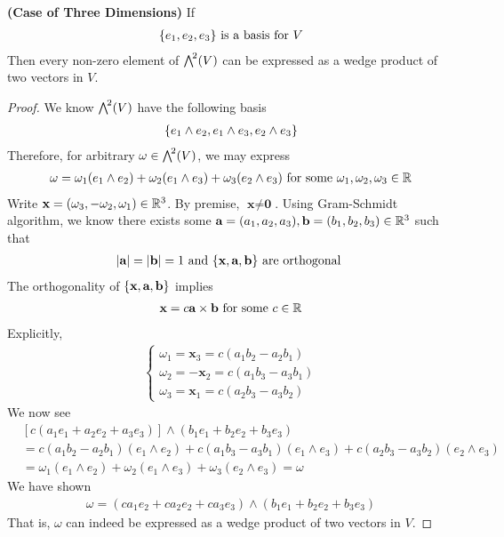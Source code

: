 \documentclass{report}
\begin{document}
\begin{theorem}
\textbf{(Case of Three Dimensions)} If 
\begin{align*}
  \{ e_1,e_2,e_3 \}\text{ is a basis for }V
\end{align*}
Then every non-zero element of $\extp^2(V)$ can be expressed as a wedge product of two vectors in $V$. 
\end{theorem}
\begin{proof}
We know $\extp^2(V)$ have the following basis  
\begin{align*}
\{ e_1\wedge  e_2, e_1 \wedge  e_3, e_2 \wedge  e_3 \} 
\end{align*}
Therefore, for arbitrary $\omega  \in \extp^2(V)$, we may express 
\begin{align*}
\omega = \omega_1 (e_1 \wedge e_2)+ \omega_2 (e_1 \wedge  e_3) + \omega_3 (e_2 \wedge  e_3)  \text{ for some }\omega_1,\omega_2,\omega_3 \in\mathbb{R}
\end{align*}
Write $\textbf{x}=(\omega_3,-\omega_2,\omega_1)\in\mathbb{R}^3$. By premise, $\textbf{x}\neq \textbf{0}$. Using Gram-Schmidt algorithm, we know there exists some $\textbf{a}=(a_1,a_2,a_3),\textbf{b}=(b_1,b_2,b_3)\in\mathbb{R}^3$ such that 
\begin{align*}
\left|\textbf{a}\right|=\left|\textbf{b}\right|=1 \text{ and }\{ \textbf{x},\textbf{a},\textbf{b} \}\text{ are orthogonal }
\end{align*}
The orthogonality of $\{ \textbf{x},\textbf{a},\textbf{b} \}$ implies 
\begin{align*}
\textbf{x}= c \textbf{a}\times \textbf{b}\text{ for some }c\in\mathbb{R}
\end{align*}
Explicitly, 
\begin{align*}
\begin{cases}
  \omega_1 = \textbf{x}_3 = c(a_1b_2-a_2b_1) \\
  \omega_2= - \textbf{x}_2= c(a_1b_3-a_3b_1) \\
  \omega_3= \textbf{x}_1= c(a_2b_3-a_3b_2)
\end{cases}
\end{align*}
We now see 
\begin{align*}
  &[c(a_1e_1+a_2e_2+a_3e_3)]\wedge  (b_1e_1+b_2e_2+b_3e_3)\\
  &= c (a_1b_2-a_2b_1) (e_1 \wedge  e_2) + c(a_1b_3 -a_3b_1)(e_1 \wedge  e_3 )+ c(a_2b_3 -a_3b_2)(e_2\wedge  e_3 ) \\
  &=\omega_1 (e_1 \wedge  e_2 )+ \omega_2 (e_1 \wedge  e_3 )+ \omega_3(e_2\wedge  e_3)=\omega
\end{align*}
We have shown 
\begin{align*}
\omega= (ca_1e_2+ca_2e_2+ca_3e_3)\wedge (b_1e_1+b_2e_2+b_3e_3) 
\end{align*}
That is, $\omega$ can indeed be expressed as a wedge product of two vectors in $V$. 

\end{proof}
\end{document}
